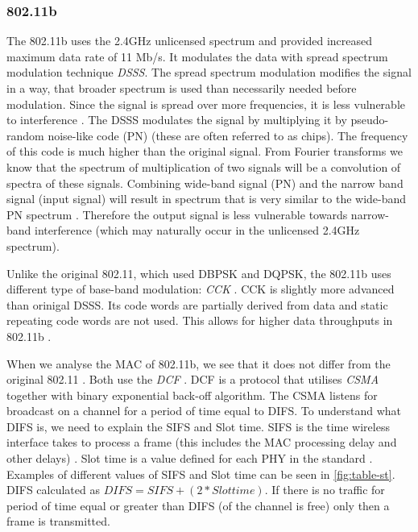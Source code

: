 \subsubsection{802.11b} \label{sec:802.11b}
% 
The 802.11b uses the 2.4GHz unlicensed spectrum and provided increased maximum data rate of 11 Mb/s. It  modulates the data with spread spectrum modulation technique \emph{\acrfull{DSSS}}. The spread spectrum modulation modifies the signal in a way, that broader spectrum is used than necessarily needed before modulation. Since the signal is spread over more frequencies, it is less vulnerable to interference \cite{MaximIntegratedProductsInc.2013AnMaxim}. The \acrshort{DSSS} modulates the signal by multiplying it by pseudo-random  noise-like code (PN) (these are often referred to as chips). The frequency of this code is much higher than the original signal. From Fourier transforms we know that the spectrum of multiplication of two signals will be a convolution of spectra of these signals. Combining wide-band signal (PN) and the narrow band signal (input signal) will result in spectrum that is very similar to the wide-band PN spectrum \cite{Haykin2001CommunicationSystems}. Therefore the output signal is less vulnerable towards narrow-band interference (which may naturally occur in the unlicensed 2.4GHz spectrum).\par
% 
Unlike the original 802.11, which used \acrfull{DBPSK} and \acrfull{DQPSK}, the 802.11b uses different type of base-band modulation: \emph{\acrfull{CCK}} \cite{2016IEEEAccess.} \cite{Aboul-Magd2008WirelessPerspective}.
CCK is slightly more advanced than orinigal \acrshort{DSSS}. Its code words are partially derived from data and static repeating code words are not used. This allows for higher data throughputs in 802.11b \cite{Gast2002802.11Guide}.\par
% 
When we analyse the \acrshort{MAC} of 802.11b, we see that it does not differ from the original 802.11 \cite{Gast2002802.11Guide}. Both use the \emph{\acrfull{DCF}} \cite{Hiertz2010TheUniverse}. \acrshort{DCF} is a protocol that utilises \emph{\acrfull{CSMA}} together with binary exponential back-off algorithm. The \acrshort{CSMA} listens for broadcast on a channel for a period of time equal to \acrfull{DIFS}. To understand what \acrshort{DIFS} is, we need to explain the \acrfull{SIFS} and Slot time. \acrshort{SIFS} is the time wireless interface takes to process a frame (this includes the MAC processing delay and other delays) \cite{2016IEEEAccess.}. Slot time is a value defined for each \acrshort{PHY} in the standard \cite{2016IEEEAccess.}. Examples of different values of SIFS and Slot time can be seen in \ref{fig:table-st}. \acrshort{DIFS} calculated as \(DIFS = SIFS + ( 2 * Slot time)\). If there is no traffic for period of time equal or greater than \acrshort{DIFS} (of the channel is free) only then a frame is transmitted.\par
